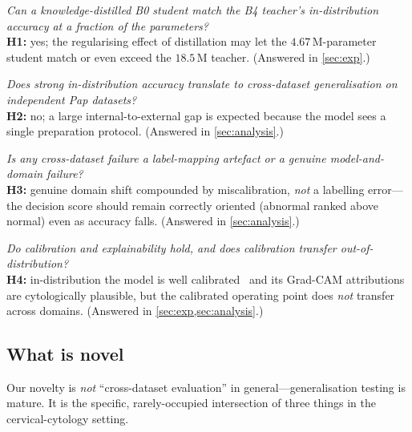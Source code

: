 \begin{description}[leftmargin=1.4em,itemsep=3pt,topsep=3pt]
\item[RQ1 (compression vs.\ skill).] \emph{Can a knowledge-distilled B0 student match the B4 teacher's
in-distribution accuracy at a fraction of the parameters?}\\
\textbf{H1:} yes; the regularising effect of distillation may let the $4.67$\,M-parameter student
match or even exceed the $18.5$\,M teacher. (Answered in \cref{sec:exp}.)

\item[RQ2 (does accuracy transfer?).] \emph{Does strong in-distribution accuracy translate to
cross-dataset generalisation on independent Pap datasets?}\\
\textbf{H2:} no; a large internal-to-external gap is expected because the model sees a single
preparation protocol. (Answered in \cref{sec:analysis}.)

\item[RQ3 (artefact or genuine failure?).] \emph{Is any cross-dataset failure a label-mapping
artefact or a genuine model-and-domain failure?}\\
\textbf{H3:} genuine domain shift compounded by miscalibration, \emph{not} a labelling error---the
decision score should remain correctly oriented (abnormal ranked above normal) even as accuracy
falls. (Answered in \cref{sec:analysis}.)

\item[RQ4 (does trust transfer?).] \emph{Do calibration and explainability hold, and does calibration
transfer out-of-distribution?}\\
\textbf{H4:} in-distribution the model is well calibrated~\cite{guo2017calibration} and its Grad-CAM
attributions are cytologically plausible, but the calibrated operating point does \emph{not} transfer
across domains. (Answered in \cref{sec:exp,sec:analysis}.)
\end{description}

\subsection{What is novel}
\label{sec:novelty}

Our novelty is \emph{not} ``cross-dataset evaluation'' in general---generalisation testing is mature.
It is the specific, rarely-occupied intersection of three things in the cervical-cytology setting.

